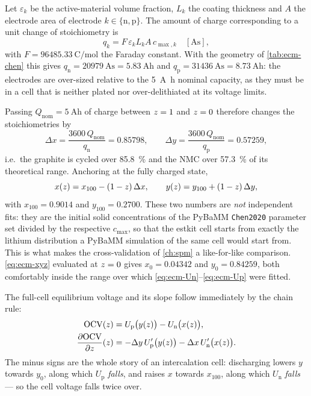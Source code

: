 Let $\varepsilon_k$ be the active-material volume fraction, $L_k$ the coating thickness and $A$
the electrode area of electrode $k\in\{\mathrm{n},\mathrm{p}\}$. The amount of charge
corresponding to a unit change of stoichiometry is
\begin{equation}
q_k = F\,\varepsilon_k L_k A\, c_{\max,k} \quad[\si{\ampere\second}],
\label{eq:ecm-qk}
\end{equation}
with $F = \SI{96485.33}{\coulomb\per\mole}$ the Faraday constant. With the geometry of
\cref{tab:ecm-chen} this gives $q_{\mathrm{n}} = \SI{20979}{\ampere\second} =
\SI{5.83}{\ampere\hour}$ and $q_{\mathrm{p}} = \SI{31436}{\ampere\second} =
\SI{8.73}{\ampere\hour}$: the electrodes are over-sized relative to the \SI{5}{\ampere\hour}
nominal capacity, as they must be in a cell that is neither plated nor over-delithiated at its
voltage limits.

Passing $Q_{\mathrm{nom}} = \SI{5}{\ampere\hour}$ of charge between $z=1$ and $z=0$
therefore changes the stoichiometries by
\begin{equation}
\Delta x = \frac{3600\,Q_{\mathrm{nom}}}{q_{\mathrm{n}}} = 0.85798, \qquad
\Delta y = \frac{3600\,Q_{\mathrm{nom}}}{q_{\mathrm{p}}} = 0.57259,
\label{eq:ecm-dxdy}
\end{equation}
i.e.\ the graphite is cycled over \SI{85.8}{\percent} and the NMC over \SI{57.3}{\percent} of its
theoretical range. Anchoring at the fully charged state,
\begin{equation}
x(z) = x_{100} - (1-z)\,\Delta x, \qquad
y(z) = y_{100} + (1-z)\,\Delta y,
\label{eq:ecm-xyz}
\end{equation}
with $x_{100}=0.9014$ and $y_{100}=0.2700$. These two numbers are \emph{not} independent fits:
they are the initial solid concentrations of the PyBaMM \texttt{Chen2020} parameter set divided
by the respective $c_{\max}$, so that the estkit cell starts from exactly the lithium
distribution a PyBaMM simulation of the same cell would start from. This is what makes the
cross-validation of \cref{ch:spm} a like-for-like comparison. \eqref{eq:ecm-xyz} evaluated at
$z=0$ gives $x_0 = 0.04342$ and $y_0 = 0.84259$, both comfortably inside the range over which
\eqref{eq:ecm-Un}--\eqref{eq:ecm-Up} were fitted.

The full-cell equilibrium voltage and its slope follow immediately by the chain rule:
\begin{align}
\mathrm{OCV}(z) &= U_{\mathrm{p}}\big(y(z)\big) - U_{\mathrm{n}}\big(x(z)\big),
\label{eq:ecm-ocv}\\
\frac{\partial\mathrm{OCV}}{\partial z}(z)
 &= -\Delta y\, U_{\mathrm{p}}'\big(y(z)\big) - \Delta x\, U_{\mathrm{n}}'\big(x(z)\big).
\label{eq:ecm-docv}
\end{align}
The minus signs are the whole story of an intercalation cell: discharging lowers $y$ towards
$y_0$, along which $U_{\mathrm{p}}$ \emph{falls}, and raises $x$ towards $x_{100}$, along which
$U_{\mathrm{n}}$ \emph{falls} --- so the cell voltage falls twice over.

